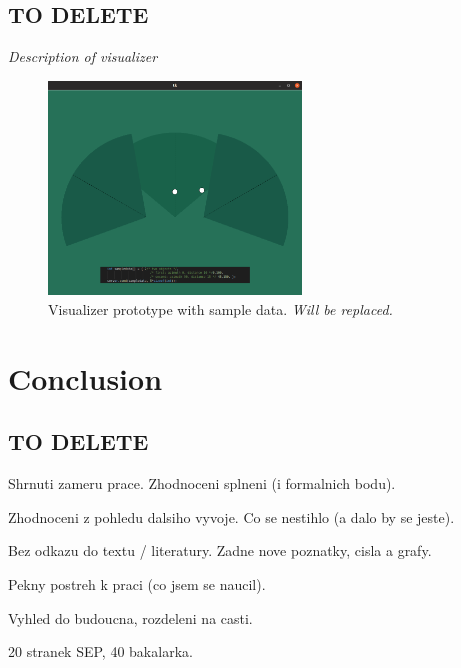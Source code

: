 \section{TO DELETE}
{\it Description of visualizer}
\begin{figure}[h!]
\begin{center}
\includegraphics[width=0.6\textwidth]{img/visualizer.png}
\caption{Visualizer prototype with sample data. {\it Will be replaced.} \label{fig:visualizer}}
\end{center}
\end{figure}






\chapter{Conclusion}

\section{TO DELETE}
Shrnuti zameru prace. Zhodnoceni splneni (i formalnich bodu).

Zhodnoceni z pohledu dalsiho vyvoje. Co se nestihlo (a dalo by se jeste).

Bez odkazu do textu / literatury. Zadne nove poznatky, cisla a grafy.

Pekny postreh k praci (co jsem se naucil).

Vyhled do budoucna, rozdeleni na casti.

20 stranek SEP, 40 bakalarka.




